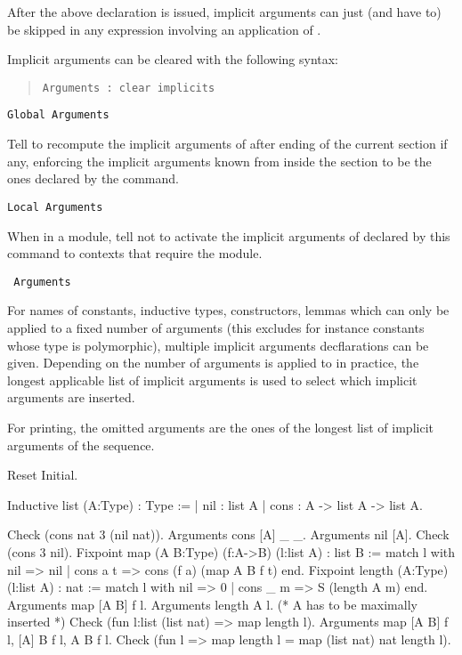 After the above declaration is issued, implicit arguments can just (and
have to) be skipped in any expression involving an application of
{\qualid}.

Implicit arguments can be cleared with the following syntax:

\begin{quote}
{\tt Arguments {\qualid} : clear implicits
}
\end{quote}

\begin{Variants}
\item {\tt Global Arguments {\qualid} \nelist{\possiblybracketedident}{}
}

Tell to recompute the implicit arguments of {\qualid} after ending of
the current section if any, enforcing the implicit arguments known
from inside the section to be the ones declared by the command.

\item {\tt Local Arguments {\qualid} \nelist{\possiblybracketedident}{}
}

When in a module, tell not to activate the implicit arguments of
{\qualid} declared by this command to contexts that require the
module.

\item {\tt {} Arguments {\qualid} \sequence{\nelist{\possiblybracketedident}{}}{,}}

For names of constants, inductive types, constructors, lemmas which
can only be applied to a fixed number of arguments (this excludes for
instance constants whose type is polymorphic), multiple 
implicit arguments decflarations can be given. 
Depending on the number of arguments {\qualid} is applied
to in practice, the longest applicable list of implicit arguments is
used to select which implicit arguments are inserted.

For printing, the omitted arguments are the ones of the longest list
of implicit arguments of the sequence.

\end{Variants}

\Example
\begin{coq_eval}
Reset Initial.
\end{coq_eval}
\begin{coq_example*}
Inductive list (A:Type) : Type :=
 | nil : list A 
 | cons : A -> list A -> list A.
\end{coq_example*}
\begin{coq_example}
Check (cons nat 3 (nil nat)).
Arguments cons [A] _ _.
Arguments nil [A].
Check (cons 3 nil).
Fixpoint map (A B:Type) (f:A->B) (l:list A) : list B :=
  match l with nil => nil | cons a t => cons (f a) (map A B f t) end.
Fixpoint length (A:Type) (l:list A) : nat :=
  match l with nil => 0 | cons _ m => S (length A m) end.
Arguments map [A B] f l.
Arguments length {A} l. (* A has to be maximally inserted *)
Check (fun l:list (list nat) => map length l).
Arguments map [A B] f l, [A] B f l, A B f l.
Check (fun l => map length l = map (list nat) nat length l).
\end{coq_example}

